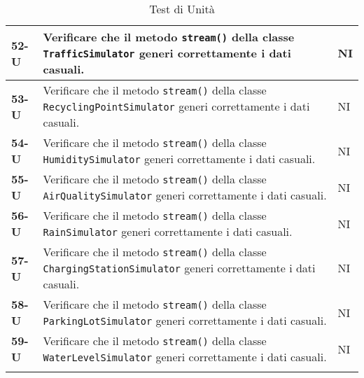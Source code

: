 \begin{longtable}{|>{\raggedright\arraybackslash}m{}|>{\raggedright\arraybackslash}m{}|>{\raggedright\arraybackslash}m{}|}
	\hline
	\textbf{52-U}   & Verificare che il metodo \texttt{stream()} della classe \texttt{TrafficSimulator} generi correttamente i dati casuali.                                            & NI             \\
	\hline
	\textbf{53-U}   & Verificare che il metodo \texttt{stream()} della classe \texttt{RecyclingPointSimulator} generi correttamente i dati casuali.                                     & NI             \\
	\hline
	\textbf{54-U}   & Verificare che il metodo \texttt{stream()} della classe \texttt{HumiditySimulator} generi correttamente i dati casuali.                                           & NI             \\
	\hline
	\textbf{55-U}   & Verificare che il metodo \texttt{stream()} della classe \texttt{AirQualitySimulator} generi correttamente i dati casuali.                                         & NI             \\
	\hline
	\textbf{56-U}   & Verificare che il metodo \texttt{stream()} della classe \texttt{RainSimulator} generi correttamente i dati casuali.                                               & NI             \\
	\hline
	\textbf{57-U}   & Verificare che il metodo \texttt{stream()} della classe \texttt{ChargingStationSimulator} generi correttamente i dati casuali.                                    & NI             \\
	\hline
	\textbf{58-U}   & Verificare che il metodo \texttt{stream()} della classe \texttt{ParkingLotSimulator} generi correttamente i dati casuali.                                         & NI             \\
	\hline
	\textbf{59-U}   & Verificare che il metodo \texttt{stream()} della classe \texttt{WaterLevelSimulator} generi correttamente i dati casuali.                                         & NI             \\
	\hline
	\caption{Test di Unità}
	\label{table:12}
\end{longtable}

